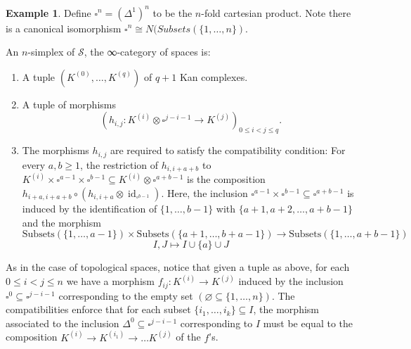 \documentclass[a4paper]{amsart}
\numberwithin{figure}{section}
\theoremstyle{theorem}
\theoremstyle{definition}
\newtheorem{exam}[thm]{Example}
\newcommand{\Sp}{{\mathcal{S}}}
\DeclareMathOperator{\id}{id}
\begin{document}
\begin{exam} \label{exam:ss}
Define $\square^n = (\Delta^1)^n$ to be the $n$-fold cartesian product. Note there is a canonical isomorphism $\square^n \cong N(Subsets(\{1, \dots, n\})$.

An $n$-simplex of $\Sp$, the ∞-category of spaces is:
\begin{enumerate}
 \item A tuple $(K^{(0)}, \dots, K^{(q)})$ of $q{+}1$ Kan complexes.

 \item A tuple of morphisms
 \[ (h_{i,j}: K^{(i)} {\otimes} \square^{j{-}i{-}1} \to K^{(j)})_{0 \leq i < j \leq q}. \]%

 \item The morphisms $h_{i,j}$ are required to satisfy the compatibility condition: For every $a, b \geq 1$, the restriction of $h_{i,i{+}a{+}b}$ to $K^{(i)}{\times}\square^{a{-}1} {\times} \square^{b{-}1} \subseteq K^{(i)}{\otimes}\square^{a{+}b{-}1}$ is the composition $h_{i{+}a,i{+}a{+}b} \circ (h_{i,i{+}a} \otimes \id_{\square^{b{-}1}})$. Here, the inclusion $\square^{a{-}1} {\times} \square^{b{-}1} \subseteq \square^{a{+}b{-}1}$ is induced by the identification of $\{1, \dots, b{-}1\}$ with $\{a{+}1, a{+}2, \dots, a{+}b{-}1\}$ and the morphism
\[ 
 \textrm{Subsets}(\{1, \dots, a{-}1\}) \times  \textrm{Subsets}(\{a{+}1, \dots, b{+}a{-}1\}) \to \textrm{Subsets}(\{1, \dots, a{+}b{-}1\}) 
 \]
 \[
 I, J \mapsto I \cup \{a\} \cup J 
\]
 \end{enumerate}

As in the case of topological spaces, notice that given a tuple as above, for each $0 \leq i < j  \leq n$ we have a morphism $f_{ij}: K^{(i)} \to K^{(j)}$ induced by the inclusion $\square^0 \subseteq \square^{j{-}i{-}1}$ corresponding to the empty set $(\varnothing \subseteq \{1, \dots, n\})$. The compatibilities enforce that for each subset $\{i_1, \dots, i_k\} \subseteq I$, the morphism associated to the inclusion $\Delta^0 \subseteq \square^{j{-}i{-}1}$ corresponding to $I$ must be equal to the composition $K^{(i)} \to K^{(i_1)} \to \dots K^{(j)}$ of the $f$'s.


\end{exam}
\end{document}
